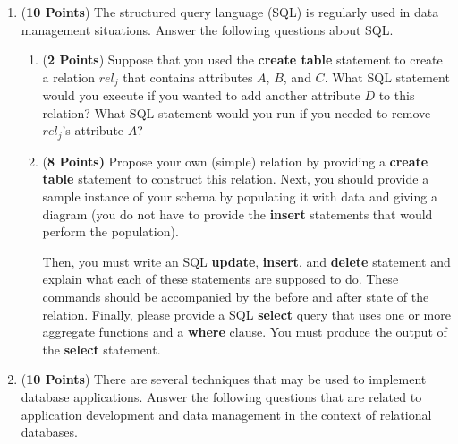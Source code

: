 \documentclass[12pt]{article}
\begin{document}
\begin{enumerate}
\newpage

\item ({\bf 10 Points}) The structured query language (SQL) is
  regularly used in data management situations.  Answer the following
  questions about SQL.

  \begin{enumerate}
    
    \item ({\bf 2 Points}) Suppose that you used the {\bf create
      table} statement to create a relation $rel_j$ that contains
      attributes $A$, $B$, and $C$.  What SQL statement would you
      execute if you wanted to add another attribute $D$ to this
      relation?  What SQL statement would you run if you needed to
      remove $rel_j$'s attribute $A$?

    \item ({\bf 8 Points)} Propose your own (simple) relation by
      providing a {\bf create table} statement to construct this
      relation.  Next, you should provide a sample instance of your
      schema by populating it with data and giving a diagram (you do
      not have to provide the {\bf insert} statements that would
      perform the population).

      Then, you must write an SQL {\bf update}, {\bf insert}, and {\bf
        delete} statement and explain what each of these statements
      are supposed to do.  These commands should be accompanied by the
      before and after state of the relation.  Finally, please provide
      a SQL {\bf select} query that uses one or more aggregate
      functions and a {\bf where} clause.  You must produce the output
      of the {\bf select} statement.

    \end{enumerate}

\newpage

\item ({\bf 10 Points}) There are several techniques that may be used
  to implement database applications.  Answer the following questions
  that are related to application development and data management in
  the context of relational databases.

  \begin{enumerate}



\end{enumerate}
\end{enumerate}
\end{document}
